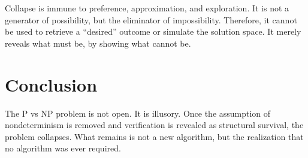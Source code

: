 \documentclass[12pt]{article}
\begin{document}
Collapse is immune to preference, approximation, and exploration. It is not a generator of possibility, but the eliminator of impossibility. Therefore, it cannot be used to retrieve a “desired” outcome or simulate the solution space. It merely reveals what must be, by showing what cannot be.


\section{Conclusion}

The P vs NP problem is not open. It is illusory. Once the assumption of nondeterminism is removed and verification is revealed as structural survival, the problem collapses. What remains is not a new algorithm, but the realization that no algorithm was ever required.
\end{document}
